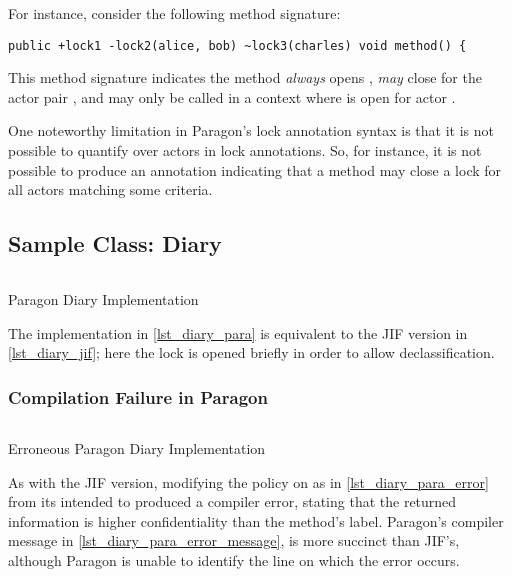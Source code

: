 For instance, consider the following method signature:

\begin{verbatim}
public +lock1 -lock2(alice, bob) ~lock3(charles) void method() {
\end{verbatim}

This method signature indicates the method \textit{always} opens , \textit{may} close  for the actor pair , and may only be called in a context where  is open for actor .

One noteworthy limitation in Paragon's lock annotation syntax is that it is not possible to quantify over actors in lock annotations. So, for instance, it is not possible to produce an annotation indicating that a method may close a lock for all actors matching some criteria.

\newpage

\subsection{Sample Class: Diary}

\begin{listing}[!ht]
	\inputminted{java}{content/code_sections/jif_para_bg/Diary.para}
	\caption{Paragon Diary Implementation}
	\label{lst_diary_para}
\end{listing}

The implementation in \autoref{lst_diary_para} is equivalent to the JIF version in \autoref{lst_diary_jif}; here the  lock is opened briefly in order to allow declassification.

\subsubsection{Compilation Failure in Paragon}

\begin{listing}[!ht]
	\inputminted{java}{content/code_sections/jif_para_bg/DiaryError.para}
	\caption{Erroneous Paragon Diary Implementation}
	\label{lst_diary_para_error}
\end{listing}

As with the JIF version, modifying the policy on  as in \autoref{lst_diary_para_error} from its intended  to  produced a compiler error, stating that the returned information is higher confidentiality than the method's label. Paragon's compiler message in \autoref{lst_diary_para_error_message}, is more succinct than JIF's, although Paragon is unable to identify the line on which the error occurs.

